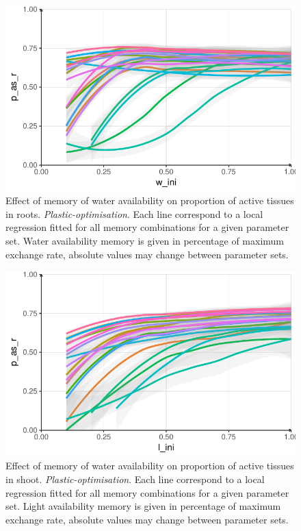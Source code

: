 \begin{figure}
\includegraphics[width = \textwidth]{./2_PP/Figures/Individual/w_ini_p_as_r.pdf}
\caption{Effect of memory of water availability on proportion of active tissues in roots. \textit{Plastic-optimisation}. Each line correspond to a local regression fitted for all memory combinations for a given parameter set. Water availability memory is given in percentage of maximum exchange rate, absolute values may change between parameter sets.}\label{fig:w_ini_p_as_r}
\end{figure}


\begin{figure}
\includegraphics[width = \textwidth]{./2_PP/Figures/Individual/l_ini_p_as_r.pdf}
\caption{Effect of memory of water availability on proportion of active tissues in shoot. \textit{Plastic-optimisation}. Each line correspond to a local regression fitted for all memory combinations for a given parameter set. Light availability memory is given in percentage of maximum exchange rate, absolute values may change between parameter sets.}\label{fig:l_ini_p_as_r}
\end{figure}


